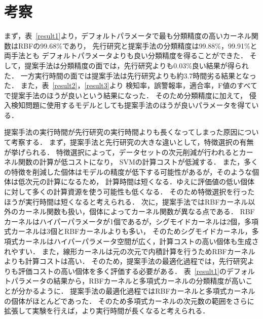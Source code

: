 \section{考察}
まず，表~\ref{result1}より，デフォルトパラメータで最も分類精度の高いカーネル関数はRBFの99.68\%であり，
先行研究と提案手法の分類精度は99.88\%，99.91\%と両手法とも
デフォルトパラメータよりも良い分類精度を得ることができた．
そして，提案手法は分類精度の面では，先行研究よりも0.03\%良い結果が得られた．
一方実行時間の面では提案手法は先行研究よりも約3.7時間劣る結果となった．
また，表~\ref{result2}，\ref{result3}より
検知率，誤警報率，適合率，F値のすべてで提案手法のほうが良いという結果になった．
そのため分類精度に加えて，
侵入検知問題に使用するモデルとしても提案手法のほうが良いパラメータを得ている．

提案手法の実行時間が先行研究の実行時間よりも長くなってしまった原因について考察する．
まず，提案手法と先行研究の大きな違いとして，特徴選択の有無が挙げられる．
特徴選択によって，データセットの次元削減が行われるとカーネル関数の計算が低コストになり，
SVMの計算コストが低減する．
また，多くの特徴を削減した個体はモデルの精度が低下する可能性があるが，そのような個体は低次元の計算になるため，
計算時間は短くなる．ゆえに評価値の低い個体に対して多くの計算資源を使う可能性も低くなる．
そのため特徴選択を行ったほうが実行時間は短くなると考えられる．
次に，提案手法ではRBFカーネル以外のカーネル関数も扱い，個体によってカーネル関数が異なる点である．
RBFカーネルはハイパーパラメータが1個であるが，シグモイドカーネルは2個，多項式カーネルは3個とRBFカーネルよりも多い，
そのためシグモイドカーネル，多項式カーネルはハイパーパラメータ空間が広く，計算コストの高い個体も生成されやすい．
また，線形カーネルは元の次元で内積計算を行うためRBFカーネルよりも計算コストは高い．
そのため，提案手法の最適化過程では，先行研究よりも評価コストの高い個体を多く評価する必要がある．
表~\ref{result1}のデフォルトパラメータの結果から，RBFカーネルと多項式カーネルの分類精度が高いことが分かるように．
提案手法の最適化過程ではRBFカーネルと多項式カーネルの個体がほとんどであった．
そのため多項式カーネルの次元数の範囲をさらに拡張して実験を行えば，より実行時間が長くなると考えられる．


